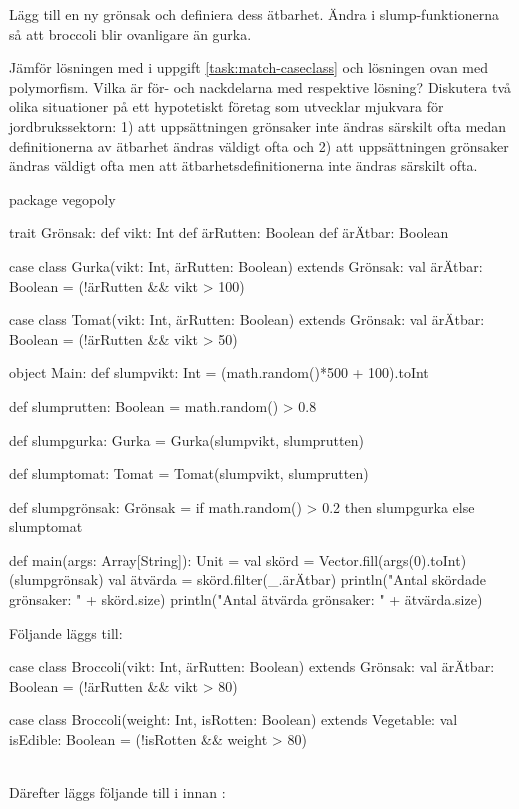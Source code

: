 \Subtask Lägg till en ny grönsak  och definiera dess ätbarhet. Ändra i slump-funktionerna så att broccoli blir ovanligare än gurka.

\Subtask Jämför lösningen med  i uppgift \ref{task:match-caseclass} och lösningen ovan med polymorfism. Vilka är för- och nackdelarna med respektive lösning? Diskutera två olika situationer på ett hypotetiskt företag som utvecklar mjukvara för jordbrukssektorn: 1) att uppsättningen grönsaker inte ändras särskilt ofta medan definitionerna av ätbarhet ändras väldigt ofta och 2) att uppsättningen grönsaker ändras väldigt ofta men att ätbarhetsdefinitionerna inte ändras särskilt ofta.



\SOLUTION


\TaskSolved \what


\SubtaskSolved
\begin{Code}
package vegopoly

trait Grönsak:
	def vikt: Int
	def ärRutten: Boolean
	def ärÄtbar: Boolean

case class Gurka(vikt: Int, ärRutten: Boolean) extends Grönsak:
  val ärÄtbar: Boolean = (!ärRutten && vikt > 100)

case class Tomat(vikt: Int, ärRutten: Boolean) extends Grönsak:
  val ärÄtbar: Boolean = (!ärRutten && vikt > 50)

object Main:
	def slumpvikt: Int = (math.random()*500 + 100).toInt

	def slumprutten: Boolean = math.random() > 0.8

	def slumpgurka: Gurka = Gurka(slumpvikt, slumprutten)

	def slumptomat: Tomat = Tomat(slumpvikt, slumprutten)

	def slumpgrönsak: Grönsak =
    if math.random() > 0.2 then slumpgurka else slumptomat

	def main(args: Array[String]): Unit = 
		val skörd = Vector.fill(args(0).toInt)(slumpgrönsak)
		val ätvärda = skörd.filter(_.ärÄtbar)
		println("Antal skördade grönsaker: " + skörd.size)
		println("Antal ätvärda grönsaker: " + ätvärda.size)
\end{Code}

\SubtaskSolved
Följande  läggs till:
\ifswedish
\begin{Code}
case class Broccoli(vikt: Int, ärRutten: Boolean) extends Grönsak:
  val ärÄtbar: Boolean = (!ärRutten && vikt > 80)
\end{Code}
\else
\begin{Code}
case class Broccoli(weight: Int, isRotten: Boolean) extends Vegetable:
  val isEdible: Boolean = (!isRotten && weight > 80)
\end{Code}
\fi
~\\
Därefter läggs följande till i  innan \ifswedish{}\else{}\fi:

